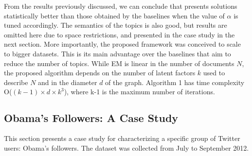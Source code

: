 

%




From the results previously discussed, we can conclude that \method presents solutions statistically better than those obtained by the baselines when the value of $\alpha$ is tuned accordingly. The semantics of the topics is also good, but results are omitted here due to space restrictions, and presented in the case study in the next section. More importantly, the proposed framework was conceived to scale to bigger datasets. This is its main advantage over the baselines that aim to reduce the number of topics. While EM is linear in the number of documents $N$, the proposed algorithm depends on the number of latent factors $k$ used to describe $N$ and in the diameter $d$ of the graph. Algorithm 1 has time complexity O($(k-1) \times d \times k^3$), where k-1 is the maximum number of 
iterations.


\subsection{Obama's Followers: A Case Study}

This section presents a case study for characterizing a specific group of Twitter users: Obama's followers. The dataset was collected from July to September 2012. %

